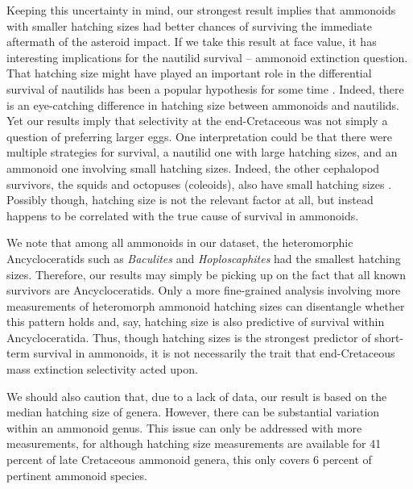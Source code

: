 \documentclass[a4paper]{article}
\begin{document}

Keeping this uncertainty in mind, our strongest result implies that ammonoids with smaller hatching sizes had better chances of surviving the immediate aftermath of the asteroid impact. 
If we take this result at face value, it has interesting implications for the nautilid survival -- ammonoid extinction question. 
That hatching size might have played an important role in the differential survival of nautilids has been a popular hypothesis for some time \parencite{stilwellRecordsNautiloideaMollusca1996, waniLargeHatchlingSize2011, debaetsEarlyEvolutionaryTrends2012, laptikhovskyEnvironmentalImpactEctocochleate2013, tajikaOldNewPlankton2018, tajikaIntraInterspecificVariability2022}. Indeed, there is an eye-catching difference in hatching size between ammonoids and nautilids.  
Yet our results imply that selectivity at the end-Cretaceous was not simply a question of preferring larger eggs. One interpretation could be that there were multiple strategies for survival, a nautilid one with large hatching sizes, and an ammonoid one involving small hatching sizes. Indeed, the other cephalopod survivors, the squids and octopuses (coleoids), also have small hatching sizes \parencite{fuchsEvolutionReproductiveStrategies2020}.
Possibly though, hatching size is not the relevant factor at all, but instead happens to be correlated with the true cause of survival in ammonoids.

We note that among all ammonoids in our dataset, the heteromorphic Ancycloceratids such as \textit{Baculites} and \textit{Hoploscaphites} had the smallest hatching sizes. Therefore, our results may simply be picking up on the fact that all known survivors are Ancycloceratids. Only a more fine-grained analysis involving more measurements of heteromorph ammonoid hatching sizes can disentangle whether this pattern holds and, say, hatching size is also predictive of survival within Ancycloceratida. Thus, though hatching sizes is the strongest predictor of short-term survival in ammonoids, it is not necessarily the trait that end-Cretaceous mass extinction selectivity acted upon. 

We should also caution that, due to a lack of data, our result is based on the median hatching size of genera.
However, there can be substantial variation within an ammonoid genus. This issue can only be addressed with more measurements, for although  hatching size measurements are available for 41 percent of late Cretaceous ammonoid genera, this only covers 6 percent of pertinent ammonoid species.
\end{document}

